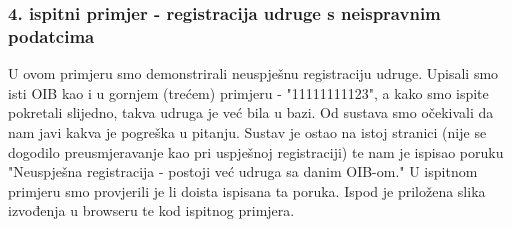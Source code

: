 			 \newpage
			 
			  \subsubsection{4. ispitni primjer - registracija udruge s neispravnim podatcima}
			 
			 U ovom primjeru smo demonstrirali neuspješnu registraciju udruge. Upisali smo isti OIB kao i u gornjem (trećem) primjeru - "11111111123", a kako smo ispite pokretali slijedno, takva udruga je već bila u bazi. Od sustava smo očekivali da nam javi kakva je pogreška u pitanju. Sustav je ostao na istoj stranici (nije se dogodilo preusmjeravanje kao pri uspješnoj registraciji) te nam je ispisao poruku "Neuspješna registracija - postoji već udruga sa danim OIB-om." U ispitnom primjeru smo provjerili je li doista ispisana ta poruka. Ispod je priložena slika izvođenja u browseru te kod ispitnog primjera. 
			 
